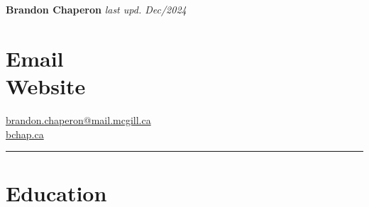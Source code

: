 \documentclass[margin,line]{resume}
\begin{document}
{\Large \textbf{Brandon Chaperon} \hfill\footnotesize {\it last upd. Dec/2024} \hphantom{.............................}}
\begin{resume}


	\section{\mysidestyle Email \vspace{0.3em}\\Website}
	\href{mailto:brandon.chaperon@mail.mcgill.ca}{%
		brandon.chaperon@mail.mcgill.ca
	}\vspace{0.3em}\\
	\href{https://bchaper0n.github.io/}{bchap.ca}


	\vspace{-1em}\rule{\columnwidth}{0.4pt}


	\vspace{-0.7em}

	\section{\mysidestyle Education}


\end{resume}
\end{document}
